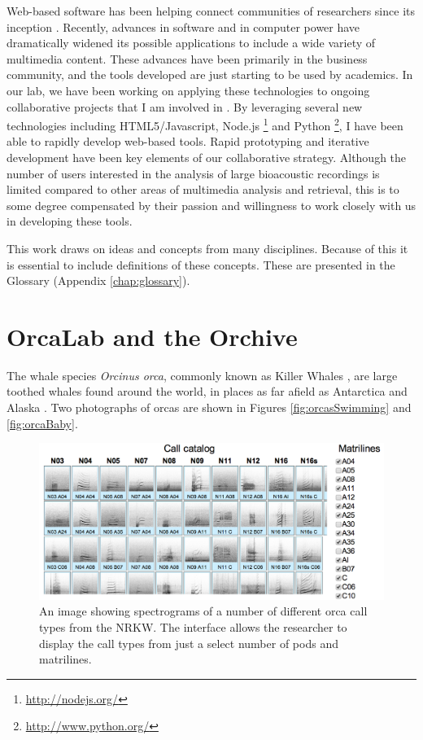 Web-based software has been helping connect communities of researchers
since its inception \cite{bernerslee1992www}.  Recently, advances in
software and in computer power have dramatically widened its possible
applications to include a wide variety of multimedia content.  These
advances have been primarily in the business community, and the tools
developed are just starting to be used by academics. In our lab, we
have been working on applying these technologies to ongoing
collaborative projects that I am involved in
\cite{ness2008chants}. By leveraging several new technologies
including HTML5/Javascript,
Node.js \footnote{\url{http://nodejs.org/}} and
Python \footnote{\url{http://www.python.org/}}, I have been able to
rapidly develop web-based tools.  Rapid prototyping and iterative
development have been key elements of our collaborative
strategy. Although the number of users interested in the analysis of
large bioacoustic recordings is limited compared to other areas of
multimedia analysis and retrieval, this is to some degree compensated
by their passion and willingness to work closely with us in developing
these tools.

This work draws on ideas and concepts from many disciplines.  Because
of this it is essential to include definitions of these concepts.
These are presented in the Glossary (Appendix \ref{chap:glossary}).

%
%
\section{OrcaLab and the Orchive}
\label{section:introduction:orchive}

The whale species \textit{Orcinus orca}, commonly known as Killer
Whales \cite{ford2000book}, are large toothed whales found around the
world, in places as far afield as Antarctica and Alaska
\cite{estes2009decline}.  Two photographs of orcas are shown in Figures
\ref{fig:orcasSwimming} and \ref{fig:orcaBaby}.

\begin{figure}[t]
\centering
\includegraphics[width=\columnwidth]{figures/orcaCallCatalog}
\caption{An image showing spectrograms of a number of different orca
  call types from the NRKW.  The interface
  allows the researcher to display the call types from just a select number
  of pods and matrilines.}
\label{fig:orcaCallCatalog}
\end{figure}

